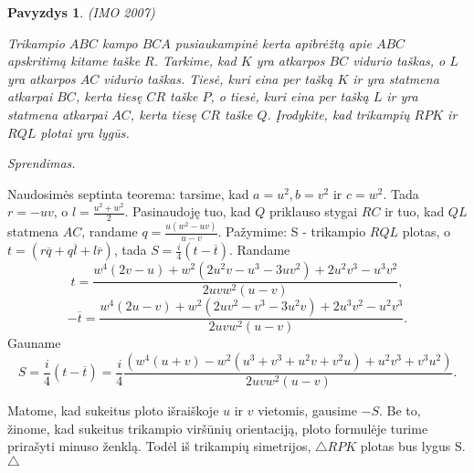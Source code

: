 \documentclass[11pt,a4paper,twoside]{book}
\newenvironment{sprendimas}{\noindent \textit{Sprendimas.}}{\hfill $\triangle$}
\newcounter{foo}[subsection]
\newtheorem{pavnr}[foo]{Pavyzdys}
\theoremstyle{definition} \newtheorem*{api}{Apibrėžimas}
\theoremstyle{remark} \newtheorem*{pastaba}{Pastaba}
\begin{document}
\begin{pavnr}
(IMO 2007)

Trikampio $ABC$ kampo $BCA$ pusiaukampinė kerta apibrėžtą apie $ABC$ apskritimą kitame taške $R$. Tarkime, kad $K$ yra atkarpos $BC$ vidurio taškas, o $L$ yra atkarpos $AC$ vidurio taškas. Tiesė, kuri eina per tašką $K$ ir yra statmena atkarpai $BC$, kerta tiesę $CR$ taške $P$, o tiesė, kuri eina per tašką $L$ ir yra statmena atkarpai $AC$, kerta tiesę $CR$ taške $Q$. Įrodykite, kad trikampių $RPK$ ir $RQL$ plotai yra lygūs.
\end{pavnr}
\begin{sprendimas}

Naudosimės septinta teorema: tarsime, kad $a=u^2, b=v^2$ ir $c=w^2$. Tada $r=-uv$, o $l=\frac{u^2+w^2}{2}$. Pasinaudoję tuo, kad $Q$ priklauso stygai $RC$ ir tuo, kad $QL$ statmena $AC$, randame $q=\frac{u(w^2 - uv)}{u-v}$. Pažymime: S - trikampio $RQL$ plotas, o $t=(r\overline{q} +q\overline{l}+l\overline{r})$, tada $S=\frac{i}{4}(t-\overline{t})$. 
Randame
$$t=\frac{w^4(2v-u) +w^2(2u^2v-u^3-3uv^2) +2u^2v^3 - u^3v^2}{2uvw^2(u-v)},$$
$$-\overline{t}=\frac{w^4(2u-v) +w^2(2uv^2-v^3-3u^2v) +2u^3v^2 - u^2v^3}{2uvw^2(u-v)}.$$
Gauname
$$S=\frac{i}{4}(t-\overline{t})=\frac{i}{4}\frac{(w^4(u+v)-w^2(u^3+v^3+u^2v+v^2u)+u^2v^3+v^3u^2)}{2uvw^2(u-v)}.$$

Matome, kad sukeitus ploto išraiškoje $u$ ir $v$ vietomis, gausime $-S$. Be to, žinome, kad sukeitus trikampio viršūnių orientaciją, ploto formulėje turime prirašyti minuso ženklą. Todėl iš trikampių simetrijos, $\triangle RPK$ plotas bus lygus S.
\end{sprendimas}
\end{document}
